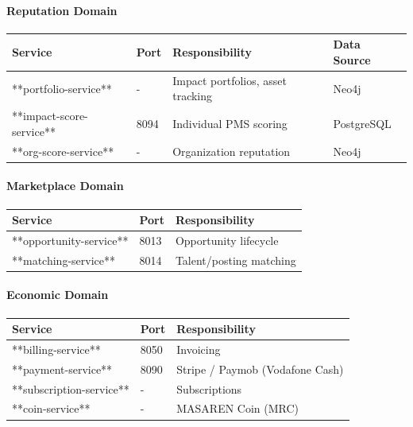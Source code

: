 \documentclass[11pt,a4paper]{article}
\begin{document}
\paragraph{Reputation Domain}

\begin{table}[H]
\centering
\begin{tabular}{|l|l|l|l|}
\hline
Service & Port & Responsibility & Data Source \\
\hline
**portfolio-service** & - & Impact portfolios, asset tracking & Neo4j \\
\hline
**impact-score-service** & 8094 & Individual PMS scoring & PostgreSQL \\
\hline
**org-score-service** & - & Organization reputation & Neo4j \\
\hline
\end{tabular}
\end{table}

\paragraph{Marketplace Domain}

\begin{table}[H]
\centering
\begin{tabular}{|l|l|l|}
\hline
Service & Port & Responsibility \\
\hline
**opportunity-service** & 8013 & Opportunity lifecycle \\
\hline
**matching-service** & 8014 & Talent/posting matching \\
\hline
\end{tabular}
\end{table}

\paragraph{Economic Domain}

\begin{table}[H]
\centering
\begin{tabular}{|l|l|l|}
\hline
Service & Port & Responsibility \\
\hline
**billing-service** & 8050 & Invoicing \\
\hline
**payment-service** & 8090 & Stripe / Paymob (Vodafone Cash) \\
\hline
**subscription-service** & - & Subscriptions \\
\hline
**coin-service** & - & MASAREN Coin (MRC) \\
\hline
\end{tabular}
\end{table}
\end{document}
